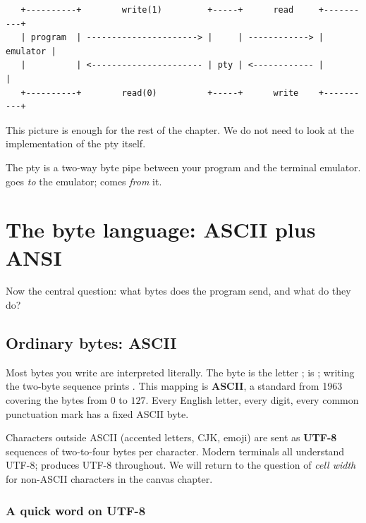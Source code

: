 \begin{center}
\small
\begin{verbatim}
   +----------+        write(1)         +-----+      read     +----------+
   | program  | ----------------------> |     | ------------> | emulator |
   |          | <---------------------- | pty | <------------ |          |
   +----------+        read(0)          +-----+      write    +----------+
\end{verbatim}
\end{center}

This picture is enough for the rest of the chapter. We do not need to
look at the implementation of the pty itself.

\begin{idea}
The pty is a two-way byte pipe between your program and the terminal
emulator.  goes \emph{to} the emulator; 
comes \emph{from} it.
\end{idea}

\section{The byte language: ASCII plus ANSI}

Now the central question: what bytes does the program send, and what
do they do?

\subsection{Ordinary bytes: ASCII}

Most bytes you write are interpreted literally. The byte 
is the letter ;  is ; writing the two-byte
sequence  prints . This mapping is
\textbf{ASCII}, a standard from 1963 covering the bytes from $0$ to
$127$. Every English letter, every digit, every common punctuation
mark has a fixed ASCII byte.

Characters outside ASCII (accented letters, CJK, emoji) are sent as
\textbf{UTF-8} sequences of two-to-four bytes per character. Modern
terminals all understand UTF-8; \maya{} produces UTF-8 throughout. We
will return to the question of \emph{cell width} for non-ASCII
characters in the canvas chapter.

\subsubsection*{A quick word on UTF-8}

